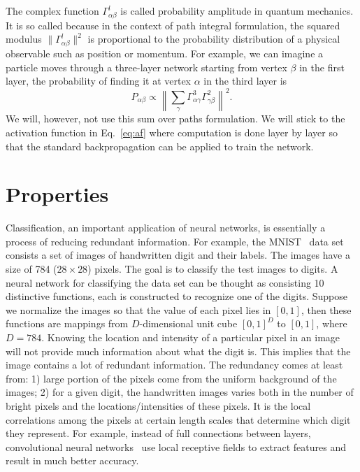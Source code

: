 \documentclass{article}
\begin{document}
The complex function \(\Gamma^{l}_{\alpha\beta}\) is called probability
amplitude in quantum mechanics. It is so called because in the context of
path integral formulation, the squared modulus
\(\|\Gamma^{l}_{\alpha\beta}\|^{2}\) is proportional to the probability
distribution of a physical observable such as position or momentum. For
example, we can imagine a particle moves through a three-layer network
starting from vertex \(\beta\) in the first layer, the probability of
finding it at vertex \(\alpha\) in the third layer is
\begin{equation*}
  P_{\alpha\beta} \propto \left\| \sum_{\gamma}\Gamma^{3}_{\alpha\gamma}\Gamma^{2}_{\gamma\beta}\right\|^{2}.
\end{equation*}
We will, however, not use this sum over paths formulation. We will stick to
the activation function in Eq.~\ref{eq:af} where computation is done layer
by layer so that the standard backpropagation can be applied to train the
network. 

\section{Properties}

Classification, an important application of neural networks, is essentially
a process of reducing redundant information. For example, the
MNIST~\cite{MNIST} data set consists a set of images of handwritten digit and
their labels. The images have a size of 784 (\(28\times28\)) pixels. The
goal is to classify the test images to digits. A neural network for
classifying the data set can be thought as consisting 10 distinctive
functions, each is constructed to recognize one of the digits. Suppose we
normalize the images so that the value of each pixel lies in \([0,1]\), then
these functions are mappings from \(D\)-dimensional unit cube \([0, 1]^{D}\)
to \([0,1]\), where \(D = 784\). Knowing the location and intensity of a
particular pixel in an image will not provide much information about what
the digit is. This implies that the image contains a lot of redundant
information. The redundancy comes at least from: 1) large portion of the
pixels come from the uniform background of the images; 2) for a given digit,
the handwritten images varies both in the number of bright pixels and the
locations/intensities of these pixels. It is the local correlations among
the pixels at certain length scales that determine which digit they
represent. For example, instead of full connections between layers,
convolutional neural networks~\cite{convnet} use local receptive fields to
extract features and result in much better accuracy.
\end{document}
